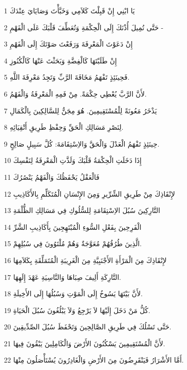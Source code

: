 \par 1 يَا ابْنِي إِنْ قَبِلْتَ كَلاَمِي وَخَبَّأْتَ وَصَايَايَ عِنْدَكَ
\par 2 حَتَّى تُمِيلَ أُذْنَكَ إِلَى الْحِكْمَةِ وَتُعَطِّفَ قَلْبَكَ عَلَى الْفَهْمِ -
\par 3 إِنْ دَعَوْتَ الْمَعْرِفَةَ وَرَفَعْتَ صَوْتَكَ إِلَى الْفَهْمِ
\par 4 إِنْ طَلَبْتَهَا كَالْفِضَّةِ وَبَحَثْتَ عَنْهَا كَالْكُنُوزِ
\par 5 فَحِينَئِذٍ تَفْهَمُ مَخَافَةَ الرَّبِّ وَتَجِدُ مَعْرِفَةَ اللَّهِ.
\par 6 لأَنَّ الرَّبَّ يُعْطِي حِكْمَةً. مِنْ فَمِهِ الْمَعْرِفَةُ وَالْفَهْمُ.
\par 7 يَذْخَرُ مَعُونَةً لِلْمُسْتَقِيمِينَ. هُوَ مِجَنٌّ لِلسَّالِكِينَ بِالْكَمَالِ
\par 8 لِنَصْرِ مَسَالِكِ الْحَقِّ وَحِفْظِ طَرِيقِ أَتْقِيَائِهِ.
\par 9 حِينَئِذٍ تَفْهَمُ الْعَدْلَ وَالْحَقَّ وَالاِسْتِقَامَةَ: كُلَّ سَبِيلٍ صَالِحٍ.
\par 10 إِذَا دَخَلَتِ الْحِكْمَةُ قَلْبَكَ وَلَذَّتِ الْمَعْرِفَةُ لِنَفْسِكَ
\par 11 فَالْعَقْلُ يَحْفَظُكَ وَالْفَهْمُ يَنْصُرُكَ
\par 12 لإِنْقَاذِكَ مِنْ طَرِيقِ الشِّرِّيرِ وَمِنَ الإِنْسَانِ الْمُتَكَلِّمِ بِالأَكَاذِيبِ
\par 13 التَّارِكِينَ سُبُلَ الاِسْتِقَامَةِ لِلسُّلُوكِ فِي مَسَالِكِ الظُّلْمَةِ
\par 14 الْفَرِحِينَ بِفَعْلِ السُّوءِ الْمُبْتَهِجِينَ بِأَكَاذِيبِ الشَّرِّ
\par 15 الَّذِينَ طُرُقُهُمْ مُعَوَّجَةٌ وَهُمْ مُلْتَوُونَ فِي سُبُلِهِمْ.
\par 16 لإِنْقَاذِكَ مِنَ الْمَرْأَةِ الأَجْنَبِيَّةِ مِنَ الْغَرِيبَةِ الْمُتَمَلِّقَةِ بِكَلاَمِهَا
\par 17 التَّارِكَةِ أَلِيفَ صِبَاهَا وَالنَّاسِيَةِ عَهْدَ إِلَهِهَا.
\par 18 لأَنَّ بَيْتَهَا يَسُوخُ إِلَى الْمَوْتِ وَسُبُلُهَا إِلَى الأَخِيلَةِ.
\par 19 كُلُّ مَنْ دَخَلَ إِلَيْهَا لاَ يَرْجِعُ وَلاَ يَبْلُغُونَ سُبُلَ الْحَيَاةِ.
\par 20 حَتَّى تَسْلُكَ فِي طَرِيقِ الصَّالِحِينَ وَتَحْفَظَ سُبُلَ الصِّدِّيقِينَ.
\par 21 لأَنَّ الْمُسْتَقِيمِينَ يَسْكُنُونَ الأَرْضَ وَالْكَامِلِينَ يَبْقُونَ فِيهَا.
\par 22 أَمَّا الأَشْرَارُ فَيَنْقَرِضُونَ مِنَ الأَرْضِ وَالْغَادِرُونَ يُسْتَأْصَلُونَ مِنْهَا.

